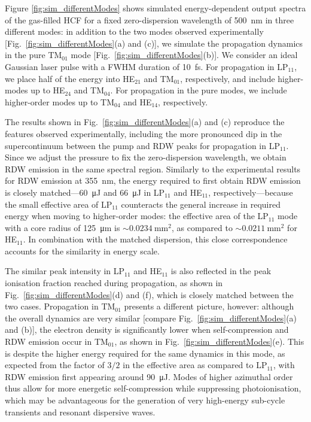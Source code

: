 \documentclass[amsmath, preprint, floatfix]{revtex4-2}
\begin{document}
Figure \ref{fig:sim_differentModes} shows simulated energy-dependent output spectra of the gas-filled HCF for a fixed zero-dispersion wavelength of \SI{500}{\nm} in three different modes: in addition to the two modes observed experimentally [Fig.~\ref{fig:sim_differentModes}(a) and (c)], we simulate the propagation dynamics in the pure TM$_{01}$ mode [Fig.~\ref{fig:sim_differentModes}(b)]. We consider an ideal Gaussian laser pulse with a FWHM duration of \SI{10}{\femto\second}. For propagation in LP$_{11}$, we place half of the energy into HE$_{21}$ and TM$_{01}$, respectively, and include higher-modes up to HE$_{24}$ and TM$_{04}$. For propagation in the pure modes, we include higher-order modes up to TM$_{04}$ and HE$_{14}$, respectively.

The results shown in Fig.~\ref{fig:sim_differentModes}(a) and (c) reproduce the features observed experimentally, including the more pronounced dip in the supercontinuum between the pump and RDW peaks for propagation in LP$_{11}$. Since we adjust the pressure to fix the zero-dispersion wavelength, we obtain RDW emission in the same spectral region. Similarly to the experimental results for RDW emission at \SI{355}{\nm}, the energy required to first obtain RDW emission is closely matched---\SI{60}{\micro\joule} and \SI{66}{\micro\joule} in LP$_{11}$ and HE$_{11}$, respectively---because the small effective area of LP$_{11}$ counteracts the general increase in required energy when moving to higher-order modes: the effective area of the LP$_{11}$ mode with a core radius of \SI{125}{\micro\meter} is $\sim\SI{0.0234}{\square\mm}$, as compared to $\sim\SI{0.0211}{\square\mm}$ for HE$_{11}$. In combination with the matched dispersion, this close correspondence accounts for the similarity in energy scale.

The similar peak intensity in LP$_{11}$ and HE$_{11}$ is also reflected in the peak ionisation fraction reached during propagation, as shown in Fig.~\ref{fig:sim_differentModes}(d) and (f), which is closely matched between the two cases. Propagation in TM$_{01}$ presents a different picture, however: although the overall dynamics are very similar [compare Fig.~\ref{fig:sim_differentModes}(a) and (b)], the electron density is significantly lower when self-compression and RDW emission occur in TM$_{01}$, as shown in Fig.~\ref{fig:sim_differentModes}(e). This is despite the higher energy required for the same dynamics in this mode, as expected from the factor of $3/2$ in the effective area as compared to LP$_{11}$, with RDW emission first appearing around \SI{90}{\micro\joule}. Modes of higher azimuthal order thus allow for more energetic self-compression while suppressing photoionisation, which may be advantageous for the generation of very high-energy sub-cycle transients and resonant dispersive waves.
\end{document}

